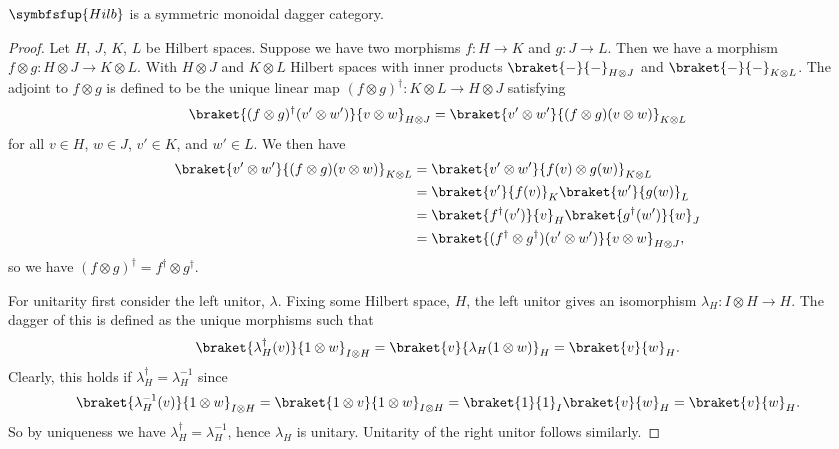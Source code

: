 \documentclass[fleqn]{NotesClass}
\makeatletter
\newcommand{\c@egory}[1]{\symbfsfup{#1}}
\newcommand{\Hilb}{\c@egory{Hilb}}
\makeatother
\begin{document}
    \begin{lma}{}{}
        \(\Hilb\) is a symmetric monoidal dagger category.
        
        \begin{proof}
            Let \(H\), \(J\), \(K\), \(L\) be Hilbert spaces.
            Suppose we have two morphisms \(f \colon H \to K\) and \(g \colon J \to L\).
            Then we have a morphism \(f \otimes g \colon H \otimes J \to K \otimes L\).
            With \(H \otimes J\) and \(K \otimes L\) Hilbert spaces with inner products \(\braket{-}{-}_{H\otimes J}\) and \(\braket{-}{-}_{K\otimes L}\).
            The adjoint to \(f \otimes g\) is defined to be the unique linear map \((f \otimes g)^\dagger \colon K \otimes L \to H \otimes J\) satisfying
            \begin{equation}
                \braket{(f \otimes g)^\dagger(v' \otimes w')}{v \otimes w}_{H\otimes J} = \braket{v' \otimes w'}{(f \otimes g)(v \otimes w)}_{K \otimes L}
            \end{equation}
            for all \(v \in H\), \(w \in J\), \(v' \in K\), and \(w' \in L\).
            We then have
            \begin{align}
                \braket{v' \otimes w'}{(f \otimes g)(v \otimes w)}_{K \otimes L} &= \braket{v' \otimes w'}{f(v) \otimes g(w)}_{K\otimes L}\\
                &= \braket{v'}{f(v)}_K \braket{w'}{g(w)}_{L}\\
                &= \braket{f^\dagger(v')}{v}_H \braket{g^\dagger(w')}{w}_J\\
                &= \braket{(f^\dagger \otimes g^\dagger)(v' \otimes w')}{v \otimes w}_{H \otimes J},\notag
            \end{align}
            so we have \((f \otimes g)^\dagger = f^\dagger \otimes g^\dagger\).
            
            For unitarity first consider the left unitor, \(\lambda\).
            Fixing some Hilbert space, \(H\), the left unitor gives an isomorphism \(\lambda_H \colon I \otimes H \to H\).
            The dagger of this is defined as the unique morphisms such that
            \begin{equation}
                \braket{\lambda_H^\dagger(v)}{1 \otimes w}_{I \otimes H} = \braket{v}{\lambda_H(1 \otimes w)}_{H} = \braket{v}{w}_H.
            \end{equation}
            Clearly, this holds if \(\lambda_H^\dagger = \lambda_H^{-1}\) since
            \begin{equation}
                \braket{\lambda_H^{-1}(v)}{1 \otimes w}_{I \otimes H} = \braket{1 \otimes v}{1 \otimes w}_{I\otimes H} = \braket{1}{1}_{I} \braket{v}{w}_{H} = \braket{v}{w}_{H}.
            \end{equation}
            So by uniqueness we have \(\lambda_H^\dagger = \lambda_H^{-1}\), hence \(\lambda_H\) is unitary.
            Unitarity of the right unitor follows similarly.
            

\end{proof}
\end{lma}
\end{document}
